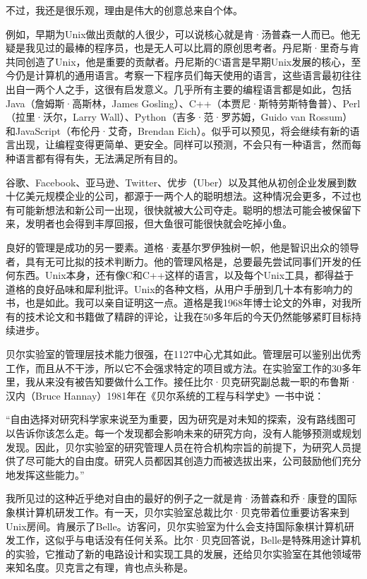 \documentclass[a4paper,12pt,UTF8,twoside]{ctexbook}
\begin{document}
不过，我还是很乐观，理由是伟大的创意总来自个体。

例如，早期为Unix做出贡献的人很少，可以说核心就是肯·汤普森一人而已。他无疑是我见过的最棒的程序员，也是无人可以比肩的原创思考者。丹尼斯·里奇与肯共同创造了Unix，他是重要的贡献者。丹尼斯的C语言是早期Unix发展的核心，至今仍是计算机的通用语言。考察一下程序员们每天使用的语言，这些语言最初往往出自一两个人之手，这很有启发意义。几乎所有主要的编程语言都是如此，包括Java（詹姆斯·高斯林，James Gosling）、C++（本贾尼·斯特劳斯特鲁普）、Perl（拉里·沃尔，Larry Wall）、Python（吉多·范·罗苏姆，Guido van Rossum）和JavaScript（布伦丹·艾奇，Brendan Eich）。似乎可以预见，将会继续有新的语言出现，让编程变得更简单、更安全。同样可以预测，不会只有一种语言，然而每种语言都有得有失，无法满足所有目的。

谷歌、Facebook、亚马逊、Twitter、优步（Uber）以及其他从初创企业发展到数十亿美元规模企业的公司，都源于一两个人的聪明想法。这种情况会更多，不过也有可能新想法和新公司一出现，很快就被大公司夺走。聪明的想法可能会被保留下来，发明者也会得到丰厚回报，但大鱼很可能很快就会吃掉小鱼。

良好的管理是成功的另一要素。道格·麦基尔罗伊独树一帜，他是智识出众的领导者，具有无可比拟的技术判断力。他的管理风格是，总要最先尝试同事们开发的任何东西。Unix本身，还有像C和C++这样的语言，以及每个Unix工具，都得益于道格的良好品味和犀利批评。Unix的各种文档，从用户手册到几十本有影响力的书，也是如此。我可以亲自证明这一点。道格是我1968年博士论文的外审，对我所有的技术论文和书籍做了精辟的评论，让我在50多年后的今天仍然能够紧盯目标持续进步。

贝尔实验室的管理层技术能力很强，在1127中心尤其如此。管理层可以鉴别出优秀工作，而且从不干涉，所以它不会强求特定的项目或方法。在实验室工作的30多年里，我从来没有被告知要做什么工作。接任比尔·贝克研究副总裁一职的布鲁斯·汉内（Bruce Hannay）1981年在《贝尔系统的工程与科学史》一书中说：

“自由选择对研究科学家来说至为重要，因为研究是对未知的探索，没有路线图可以告诉你该怎么走。每一个发现都会影响未来的研究方向，没有人能够预测或规划发现。因此，贝尔实验室的研究管理人员在符合机构宗旨的前提下，为研究人员提供了尽可能大的自由度。研究人员都因其创造力而被选拔出来，公司鼓励他们充分地发挥这些能力。”



我所见过的这种近乎绝对自由的最好的例子之一就是肯·汤普森和乔·康登的国际象棋计算机研发工作。有一天，贝尔实验室总裁比尔·贝克带着位重要访客来到Unix房间。肯展示了Belle。访客问，贝尔实验室为什么会支持国际象棋计算机研发工作，这似乎与电话没有任何关系。比尔·贝克回答说，Belle是特殊用途计算机的实验，它推动了新的电路设计和实现工具的发展，还给贝尔实验室在其他领域带来知名度。贝克言之有理，肯也点头称是。
\end{document}
